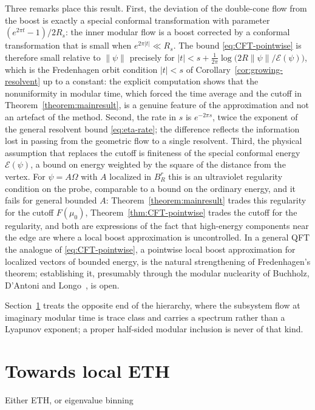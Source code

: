 \documentclass[a4paper,11pt]{article}
\theoremstyle{definition}
\begin{document}
Three remarks place this result. First, the deviation of the double-cone flow from the boost is exactly a special conformal transformation with parameter $(e^{2\pi t}-1)/2R_s$: the inner modular flow is a boost corrected by a conformal transformation that is small when $e^{2\pi|t|}\ll R_s$. The bound \eqref{eq:CFT-pointwise} is therefore small relative to $\|\psi\|$ precisely for $|t|<s+\frac1{2\pi}\log\bigl(2R\|\psi\|/\mathcal E(\psi)\bigr)$, which is the Fredenhagen orbit condition $|t|<s$ of Corollary~\ref{cor:growing-resolvent} up to a constant: the explicit computation shows that the nonuniformity in modular time, which forced the time average and the cutoff in Theorem~\ref{theorem:mainresult}, is a genuine feature of the approximation and not an artefact of the method. Second, the rate in $s$ is $e^{-2\pi s}$, twice the exponent of the general resolvent bound \eqref{eq:eta-rate}; the difference reflects the information lost in passing from the geometric flow to a single resolvent. Third, the physical assumption that replaces the cutoff is finiteness of the special conformal energy $\mathcal E(\psi)$, a bound on energy weighted by the square of the distance from the vertex. For $\psi=A\Omega$ with $A$ localized in $B_R^r$ this is an ultraviolet regularity condition on the probe, comparable to a bound on the ordinary energy, and it fails for general bounded $A$: Theorem~\ref{theorem:mainresult} trades this regularity for the cutoff $F(\mu_0)$, Theorem~\ref{thm:CFT-pointwise} trades the cutoff for the regularity, and both are expressions of the fact that high-energy components near the edge are where a local boost approximation is uncontrolled. In a general QFT the analogue of \eqref{eq:CFT-pointwise}, a pointwise local boost approximation for localized vectors of bounded energy, is the natural strengthening of Fredenhagen's theorem; establishing it, presumably through the modular nuclearity of Buchholz, D'Antoni and Longo~\cite{BDL1990}, is open.


Section~\ref{sec:nuclearity} treats the opposite end of the hierarchy, where the subsystem flow at imaginary modular time is trace class and carries a spectrum rather than a Lyapunov exponent; a proper half-sided modular inclusion is never of that kind.


\section{Towards local ETH}\label{sec:nuclearity}

Either ETH, or eigenvalue binning
\end{document}
